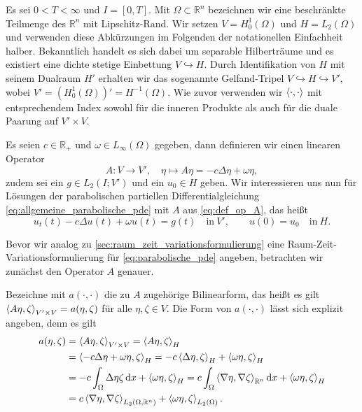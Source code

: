 Es sei $0 < T < \infty$ und $I = [0, T]$.
Mit $\Omega \subset \mathbb{R}^{n}$ bezeichnen wir eine beschränkte Teilmenge des $\mathbb{R}^{n}$ mit Lipschitz-Rand.
Wir setzen $V = H^{1}_{0}(\Omega)$ und $H = L_{2}(\Omega)$ und verwenden diese Abkürzungen im Folgenden der notationellen Einfachheit halber.
Bekanntlich handelt es sich dabei um separable Hilberträume und es existiert eine dichte stetige Einbettung $V \hookrightarrow H$.
Durch Identifikation von $H$ mit seinem Dualraum $H'$ erhalten wir das sogenannte Gelfand-Tripel $V \hookrightarrow H \hookrightarrow V'$, wobei $V' = (H^{1}_{0}(\Omega))' = H^{-1}(\Omega)$.
Wie zuvor verwenden wir $\left\langle\cdot,\cdot\right\rangle$ mit entsprechendem Index sowohl für die inneren Produkte als auch für die duale Paarung auf $V' \times V$.

Es seien $c \in \mathbb{R}_{+}$ und $\omega \in L_{\infty}(\Omega)$ gegeben, dann definieren wir einen linearen Operator
\begin{equation}
    \label{eq:def_op_A}
    A \colon V \to V', \quad \eta \mapsto A \eta = - c \Delta \eta + \omega \eta,
\end{equation}
zudem sei ein $g \in L_{2}(I; V')$ und ein $u_{0} \in H$ geben.
Wir interessieren uns nun für Lösungen der parabolischen partiellen Differentialgleichung \eqref{eq:allgemeine_parabolische_pde} mit $A$ aus \eqref{eq:def_op_A}, das heißt
\begin{equation}
    \label{eq:parabolische_pde}
    u_{t}(t) - c \Delta u(t) + \omega u(t) = g(t) \quad \text{in}~V',
    \qquad
    u(0) = u_{0} \quad \text{in}~H.
\end{equation}

Bevor wir analog zu \autoref{sec:raum_zeit_variationsformulierung} eine Raum-Zeit-Variationsformulierung für \eqref{eq:parabolische_pde} angeben, betrachten wir zunächst den Operator $A$ genauer.

Bezeichne mit $a(\cdot, \cdot)$ die zu $A$ zugehörige Bilinearform, das heißt es gilt $\left\langle A \eta,\zeta\right\rangle_{V' \times V} = a(\eta, \zeta)$ für alle $\eta, \zeta \in V$.
Die Form von $a(\cdot, \cdot)$ lässt sich explizit angeben, denn es gilt
\begin{equation}
    \label{eq:bf_a}
    \begin{aligned}
        a(\eta, \zeta)
        &= \left\langle A \eta,\zeta\right\rangle_{V' \times V}
        = \left\langle A \eta,\zeta\right\rangle_{H}
        \\&= \left\langle- c \Delta \eta + \omega \eta,\zeta\right\rangle_{H}
        = - c \left\langle\Delta \eta,\zeta\right\rangle_{H} + \left\langle\omega \eta,\zeta\right\rangle_{H}
        \\&= -c \int_{\Omega} \Delta \eta \zeta \mathop{}\!\mathrm{d} x + \left\langle\omega \eta,\zeta\right\rangle_{H}
        = c \int_{\Omega} \left\langle\nabla \eta,\nabla \zeta\right\rangle_{\mathbb{R}^{n}} \mathop{}\!\mathrm{d} x + \left\langle\omega \eta,\zeta\right\rangle_{H}
        \\&= c \left\langle\nabla \eta,\nabla \zeta\right\rangle_{L_{2}(\Omega, \mathbb{R}^{n})} + \left\langle\omega \eta,\zeta\right\rangle_{L_{2}(\Omega)}.
    \end{aligned}
\end{equation}


